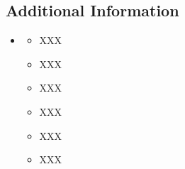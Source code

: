 \documentclass{report} %
\begin{document}

\subsection*{Additional Information}
\small
\begin{itemize}
    \item[] 
    \begin{itemize}
        \item XXX %
        \item XXX %
        \item XXX %
        \item XXX
        \item XXX
        \item XXX
    \end{itemize}
\end{itemize}

\end{document}
